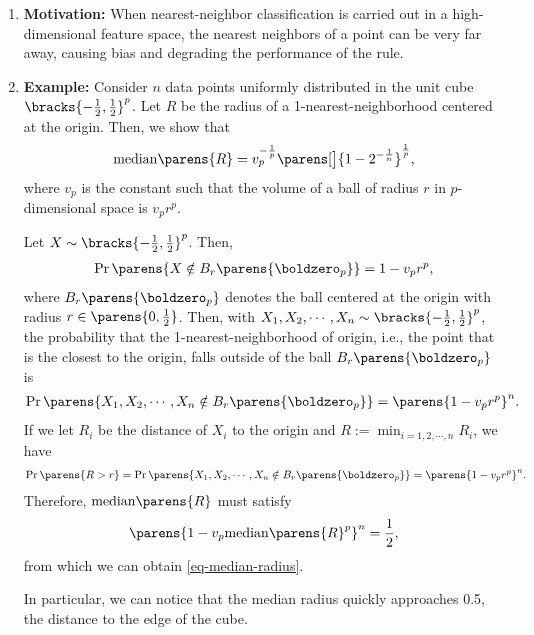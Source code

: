 \documentclass[12pt]{article}
\begin{document}
\begin{enumerate}[label=\textbf{\arabic*.}]
	
	\item \textbf{Motivation:} When nearest-neighbor classification is carried out in a high-dimensional feature space, the nearest neighbors of a point can be very far away, causing bias and degrading the performance of the rule. 
	
	\item \textbf{Example:} Consider $n$ data points uniformly distributed in the unit cube $\bracks{-\frac{1}{2}, \frac{1}{2}}^p$. Let $R$ be the radius of a 1-nearest-neighborhood centered at the origin. Then, we show that 
	\begin{align}\label{eq-median-radius}
		\mathrm{median} \parens{R} = v_p^{-\frac{1}{p}} \parens[\big]{1 - 2^{-\frac{1}{n}}}^{\frac{1}{p}}, 
	\end{align}
	where $v_p$ is the constant such that the volume of a ball of radius $r$ in $p$-dimensional space is $v_p r^p$. 
	
	Let $X \sim \bracks{-\frac{1}{2}, \frac{1}{2}}^p$. Then, 
	\begin{align*}
		\Pr \parens{X \notin B_r \parens{\boldzero_p}} = 1 - v_p r^p, 
	\end{align*}
	where $B_r \parens{\boldzero_p}$ denotes the ball centered at the origin with radius $r \in \parens{0, \frac{1}{2}}$. 	Then, with $X_1, X_2, \cdots, X_n \sim \bracks{-\frac{1}{2}, \frac{1}{2}}^p$, the probability that the 1-nearest-neighborhood of origin, i.e., the point that is the closest to the origin, falls outside of the ball $B_r \parens{\boldzero_p}$ is 
	\begin{align*}
		\Pr \parens{X_1, X_2, \cdots, X_n \notin B_r \parens{\boldzero_p}} = \parens{1 - v_p r^p}^n. 
	\end{align*}
	If we let $R_i$ be the distance of $X_i$ to the origin and $R := \min_{i=1,2,\cdots,n} R_i$, we have 
	\begin{align*}
		\Pr \parens{R > r} = \Pr \parens{X_1, X_2, \cdots, X_n \notin B_r \parens{\boldzero_p}} = \parens{1 - v_p r^p}^n. 
	\end{align*}
	Therefore, $\mathrm{median} \parens{R}$ must satisfy 
	\begin{align*}
		\parens{1 - v_p \mathrm{median} \parens{R}^p}^n = \frac{1}{2}, 
	\end{align*}
	from which we can obtain \eqref{eq-median-radius}. 
	
	In particular, we can notice that the median radius quickly approaches 0.5, the distance to the edge of the cube. 
	

\end{enumerate}
\end{document}

